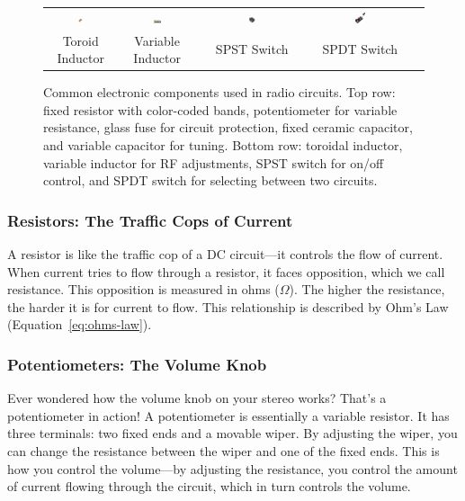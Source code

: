 \begin{figure}[h!]
\begin{tabular}{ccccc}
        \includegraphics[width=0.11\textwidth]{images/inductor} &
        \includegraphics[width=0.11\textwidth]{images/variable-inductor} &
        \includegraphics[width=0.11\textwidth]{images/spst} &
        \includegraphics[width=0.11\textwidth]{images/spdt} & \\
        Toroid Inductor & Variable Inductor & SPST Switch & SPDT Switch & \\
    \end{tabular}
    \caption{Common electronic components used in radio circuits. Top row: fixed resistor with color-coded bands, potentiometer for variable resistance, glass fuse for circuit protection, fixed ceramic capacitor, and variable capacitor for tuning. Bottom row: toroidal inductor, variable inductor for RF adjustments, SPST switch for on/off control, and SPDT switch for selecting between two circuits.}
    \label{fig:component-photos}
\end{figure}


\subsubsection*{Resistors: The Traffic Cops of Current}
A resistor is like the traffic cop of a DC circuit—it controls the flow of current. When current tries to flow through a resistor, it faces opposition, which we call resistance. This opposition is measured in ohms ($\Omega$). The higher the resistance, the harder it is for current to flow. This relationship is described by Ohm's Law (Equation~\ref{eq:ohms-law}).

\subsubsection*{Potentiometers: The Volume Knob}
Ever wondered how the volume knob on your stereo works? That's a potentiometer in action! A potentiometer is essentially a variable resistor. It has three terminals: two fixed ends and a movable wiper. By adjusting the wiper, you can change the resistance between the wiper and one of the fixed ends. This is how you control the volume—by adjusting the resistance, you control the amount of current flowing through the circuit, which in turn controls the volume.

